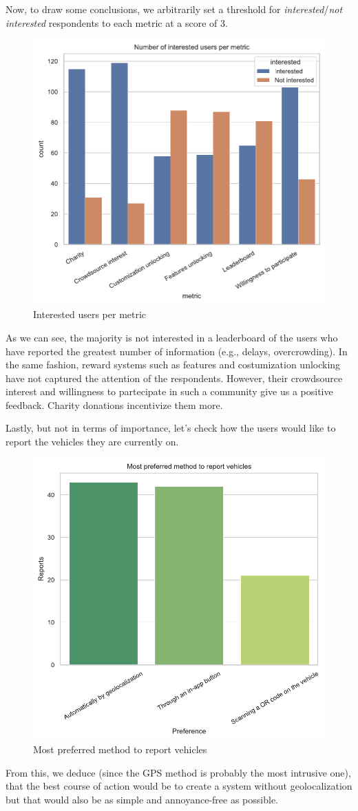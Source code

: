 \documentclass[a4paper, 11pt]{report}
\begin{document}
Now, to draw some conclusions, we arbitrarily set a threshold for \emph{interested}/\emph{not interested} respondents to each metric at a score of $3$.
\begin{figure}[H]
	\centering
	\includegraphics[width=.5\textwidth]{img/analysis/interested_users_per_metric.pdf}
	\caption{Interested users per metric}
\end{figure}
As we can see, the majority is not interested in a leaderboard of the users who have reported the greatest number of
information (e.g., delays, overcrowding). In the same fashion, reward systems such as features and costumization unlocking have not captured the attention of the
respondents. However, their crowdsource interest and willingness to partecipate in such a community give us a positive feedback.
Charity donations incentivize them more.

Lastly, but not in terms of importance, let's check how the users would like to report the vehicles they are currently on.
\begin{figure}[H]
	\centering
	\includegraphics[width=.5\textwidth]{img/analysis/most_preferred_method_to_report.pdf}
	\caption{Most preferred method to report vehicles}
\end{figure}
From this, we deduce (since the GPS method is probably the most intrusive one), that the best course of action would be to create a system without geolocalization but that would also be as simple and annoyance-free as possible.
\end{document}
